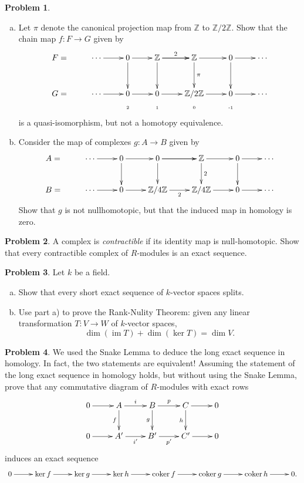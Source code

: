 \documentclass[11pt]{article}
\DeclareMathOperator{\coker}{coker}
\DeclareMathOperator{\im}{im}
\newcommand{\Z}{\mathbb{Z}}
\theoremstyle{definition}
\newtheorem{problem}{Problem}
\begin{document}
\begin{problem}$\,$
\begin{enumerate}[a)]
	\item Let $\pi$ denote the canonical projection map from $\Z$ to $\Z/2\Z$. Show that the chain map $f\!: F \longrightarrow G$ given by
$$\xymatrix@R=1mm{F = & \cdots \ar[r] & 0 \ar[r] \ar[dddd] & \Z \ar[r]^-2 \ar[dddd] \ar[r] & \Z \ar[dddd]^-{\pi} \ar[r] & 0 \ar[dddd] \ar[r] & \cdots \\
	&&&&\\ 
	&&&&\\ 
	&&&&\\ 
	G = &\cdots \ar[r] & 0 \ar[r] & 0 \ar[r] & \Z/2\Z \ar[r] & 0 \ar[r] & \cdots \\
	&& \textrm{\tiny 2} & \textrm{\tiny 1} & \textrm{\tiny 0} &\textrm{\tiny -1}}$$
is a quasi-isomorphism, but not a homotopy equivalence.
	
\item Consider the map of complexes $g\!: A \to B$ given by
$$\xymatrix{A = & \cdots \ar[r] & 0 \ar[r] \ar[d] & 0 \ar[r] \ar[d] \ar[r] & \Z \ar[d]^-{2} \ar[r] & 0 \ar[d] \ar[r] & \cdots \\ 
	B = & \cdots \ar[r] & 0 \ar[r] & \Z/4\Z \ar[r]_-2 & \Z/4\Z \ar[r] & 0 \ar[r] & \cdots}$$
Show that $g$ is not nullhomotopic, but that the induced map in homology is zero.
\end{enumerate}
\end{problem}

\vfill

\begin{problem}
	A complex is \emph{contractible} if its identity map is null-homotopic. Show that every contractible complex of $R$-modules is an exact sequence.
\end{problem}

\vfill


\begin{problem}
	Let $k$ be a field. 
\begin{enumerate}[a)]
	\item Show that every short exact sequence of $k$-vector spaces splits.	
	\item Use part a) to prove the Rank-Nulity Theorem: given any linear transformation $T\!: V \to W$ of $k$-vector spaces, 
	$$\dim(\im T) + \dim(\ker T) = \dim V.$$
\end{enumerate}
\end{problem}


\begin{problem}
	We used the Snake Lemma to deduce the long exact sequence in homology. In fact, the two statements are equivalent! Assuming the statement of the long exact sequence in homology holds, but without using the Snake Lemma, prove that any commutative diagram of $R$-modules with exact rows
	$$\xymatrix{0 \ar[r] & A \ar[d]_-f
	\ar[r]^-i & B \ar[r]^-p \ar[d]_-g & C \ar[r] \ar[d]_-h & 0 \\ 0 \ar[r] & A'
	\ar[r]_-{i'} & B' \ar[r]_-{p'} & C' \ar[r] & 0}$$
	induces an exact sequence
	$$\xymatrix{0 \ar[r] & \ker f \ar[r] & \ker g \ar[r] & \ker h \ar[r] & \coker f \ar[r] & \coker g \ar[r] & \coker h \ar[r] & 0.}$$
\end{problem}
\end{document}
